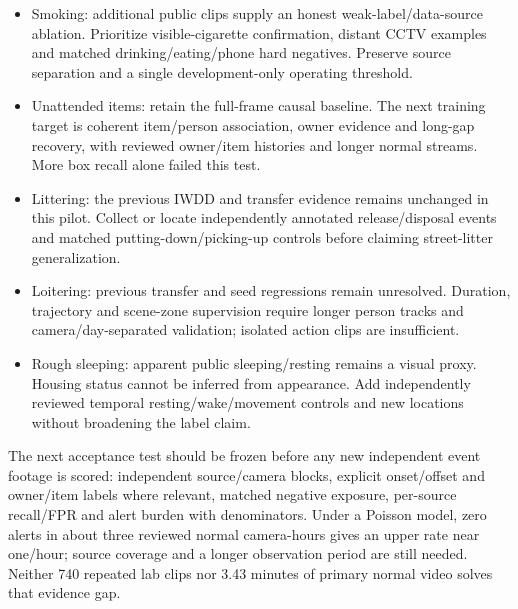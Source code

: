 \documentclass[10pt,a4paper]{article}
\begin{document}
\begin{itemize}
\item Smoking: additional public clips supply an honest weak-label/data-source ablation. Prioritize visible-cigarette confirmation, distant CCTV examples and matched drinking/eating/phone hard negatives. Preserve source separation and a single development-only operating threshold.
\item Unattended items: retain the full-frame causal baseline. The next training target is coherent item/person association, owner evidence and long-gap recovery, with reviewed owner/item histories and longer normal streams. More box recall alone failed this test.
\item Littering: the previous IWDD and transfer evidence remains unchanged in this pilot. Collect or locate independently annotated release/disposal events and matched putting-down/picking-up controls before claiming street-litter generalization.
\item Loitering: previous transfer and seed regressions remain unresolved. Duration, trajectory and scene-zone supervision require longer person tracks and camera/day-separated validation; isolated action clips are insufficient.
\item Rough sleeping: apparent public sleeping/resting remains a visual proxy. Housing status cannot be inferred from appearance. Add independently reviewed temporal resting/wake/movement controls and new locations without broadening the label claim.
\end{itemize}
The next acceptance test should be frozen before any new independent event footage is scored: independent source/camera blocks, explicit onset/offset and owner/item labels where relevant, matched negative exposure, per-source recall/FPR and alert burden with denominators. Under a Poisson model, zero alerts in about three reviewed normal camera-hours gives an upper rate near one/hour; source coverage and a longer observation period are still needed. Neither 740 repeated lab clips nor 3.43 minutes of primary normal video solves that evidence gap.
\end{document}
